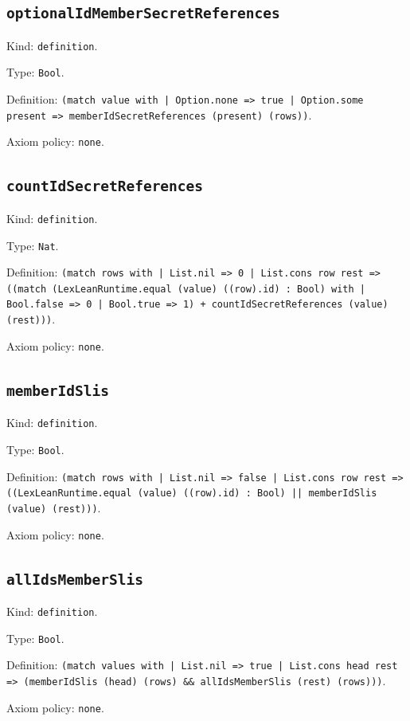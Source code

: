 \documentclass[11pt]{article}
\begin{document}
\subsection*{\texttt{optionalIdMemberSecretReferences}}
\noindent Kind: \texttt{definition}.\par
\noindent Type: \texttt{Bool}.\par
\noindent Definition: \texttt{(match value with | Option.none => true | Option.some present => memberIdSecretReferences (present) (rows))}.\par
\noindent Axiom policy: \texttt{none}.\par
\subsection*{\texttt{countIdSecretReferences}}
\noindent Kind: \texttt{definition}.\par
\noindent Type: \texttt{Nat}.\par
\noindent Definition: \texttt{(match rows with | List.nil => 0 | List.cons row rest => ((match (LexLeanRuntime.equal (value) ((row).id) : Bool) with | Bool.false => 0 | Bool.true => 1) + countIdSecretReferences (value) (rest)))}.\par
\noindent Axiom policy: \texttt{none}.\par
\subsection*{\texttt{memberIdSlis}}
\noindent Kind: \texttt{definition}.\par
\noindent Type: \texttt{Bool}.\par
\noindent Definition: \texttt{(match rows with | List.nil => false | List.cons row rest => ((LexLeanRuntime.equal (value) ((row).id) : Bool) || memberIdSlis (value) (rest)))}.\par
\noindent Axiom policy: \texttt{none}.\par
\subsection*{\texttt{allIdsMemberSlis}}
\noindent Kind: \texttt{definition}.\par
\noindent Type: \texttt{Bool}.\par
\noindent Definition: \texttt{(match values with | List.nil => true | List.cons head rest => (memberIdSlis (head) (rows) \&\& allIdsMemberSlis (rest) (rows)))}.\par
\noindent Axiom policy: \texttt{none}.\par
\end{document}
